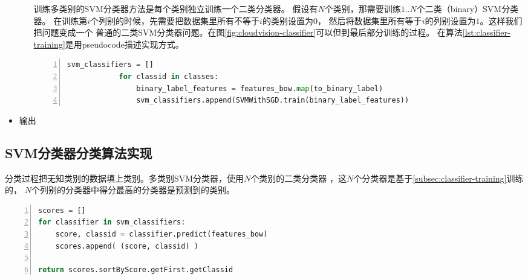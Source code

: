 \begin{itemize}
\begin{itemize}
            训练多类别的SVM分类器方法是每个类别独立训练一个二类分类器。
            假设有$N$个类别，那需要训练$1..N$个二类（binary）SVM分类器。
            在训练第$i$个列别的时候，先需要把数据集里所有不等于$i$的类别设置为$0$，
            然后将数据集里所有等于$i$的列别设置为$1$。这样我们把问题变成一个
            普通的二类SVM分类器问题。在图\ref{fig:cloudvision-classifier}可以但到最后部分训练的过程。
            在算法\ref{lst:classifier-training}是用pseudocode描述实现方式。
            \begin{lstlisting}[language=Python,
                               basicstyle=\small,
                               numbers=left,
                               showstringspaces=false,
                               caption={SVM多类别分类器训练pseudocode},
                               label={lst:classifier-training}]
            svm_classifiers = []
            for classid in classes:
                binary_label_features = features_bow.map(to_binary_label)
                svm_classifiers.append(SVMWithSGD.train(binary_label_features))
            \end{lstlisting}


        \end{itemize}
  \item 输出
\end{itemize}




\subsection{SVM分类器分类算法实现}
\label{subsec:classifier-label}
分类过程把无知类别的数据填上类别。多类别SVM分类器，使用$N$个类别的二类分类器
，这$N$个分类器是基于\ref{subsec:classifier-training}训练的，
$N$个列别的分类器中得分最高的分类器是预测到的类别。
\begin{lstlisting}[language=Python,
                   basicstyle=\small,
                   numbers=left,
                   showstringspaces=false,
                   caption={SVM多类别分类器分类pseudocode},
                   label={lst:classifier-training}]
scores = []
for classifier in svm_classifiers:
    score, classid = classifier.predict(features_bow)
    scores.append( (score, classid) )

return scores.sortByScore.getFirst.getClassid
\end{lstlisting}




